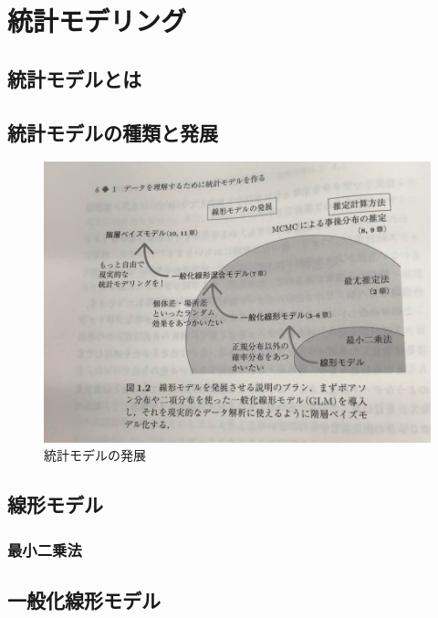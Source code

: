 
\chapter{統計モデリング}

\section{統計モデルとは}
\section{統計モデルの種類と発展}

\begin{figure}[H]
  \begin{center}
    \includegraphics[width=15cm]{images/parts/4/statistical-model.jpg}
    \caption{統計モデルの発展}
  \end{center}
\end{figure}

\section{線形モデル}
\subsection{最小二乗法}

\section{一般化線形モデル}
